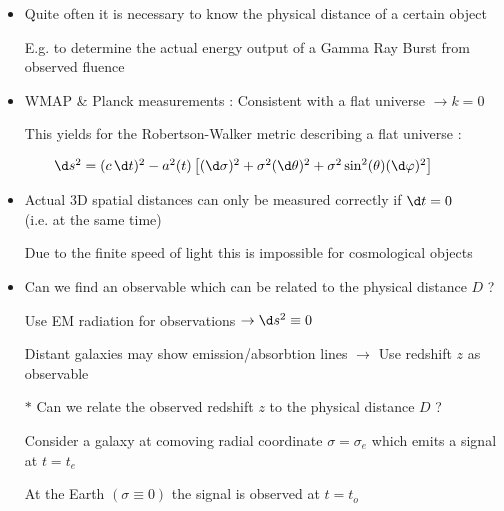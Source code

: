 \onecolumn
\begin{itemize}
\item Quite often it is necessary to know the physical distance of a certain object
\item[] E.g. to determine the actual energy output of a Gamma Ray Burst from observed fluence
\item WMAP \& Planck measurements : Consistent with a flat universe $\rightarrow k=0$
\item[] This yields for the Robertson-Walker metric describing a flat universe :
\item[] {\blue $\qquad \d s^{2}=(c\,\d t)^{2}-a^{2}(t)\left[
        (\d\sigma)^{2}+\sigma^{2}(\d\theta)^{2}+\sigma^{2}\sin^{2}(\theta)(\d\varphi)^{2}
        \right]$}
\item {\red Actual 3D spatial distances can only be measured correctly if $\d t=0$\\
      (i.e. at the same time)}
\item[] Due to the finite speed of light this is impossible for cosmological objects
\item {\blue Can we find an observable which can be related to the physical distance $D$ ?}
\item[] Use EM radiation for observations $\rightarrow \d s^{2} \equiv 0$
\item[] Distant galaxies may show emission/absorbtion lines $\rightarrow$ {\blue Use redshift $z$ as observable}
\item[$\ast$] {\red Can we relate the observed redshift $z$ to the physical distance $D$ ?}
\item[] Consider a galaxy at comoving radial coordinate $\sigma=\sigma_{e}$ which emits a signal at $t=t_{e}$
\item[] At the Earth $(\sigma \equiv 0)$ the signal is observed at $t=t_{o}$
\end{itemize}

